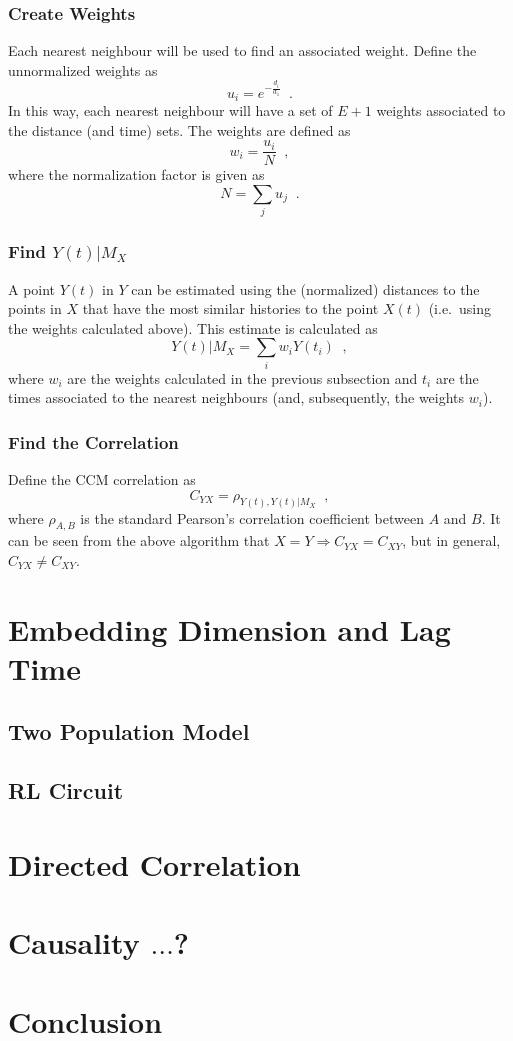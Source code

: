 \documentclass[a4paper,11pt]{article}
\begin{document}
\subsubsection{Create Weights}
Each nearest neighbour will be used to find an associated weight.  Define the unnormalized weights as$$u_i = e^{-\frac{d_i}{d_1}}\;\;.$$In this way, each nearest neighbour will have a set of $E+1$ weights associated to the distance (and time) sets.  The weights are defined as
$$
w_i = \frac{u_i}{N}\;\;,
$$
where the normalization factor is given as
$$
N = \sum_j u_j\;\;.
$$

\subsubsection{Find $Y(t)|M_X$}
A point $Y(t)$ in $Y$ can be estimated using the (normalized) distances to the points in $X$ that have the most similar histories to the point $X(t)$ (i.e.\ using the weights calculated above).  This estimate is calculated as$$Y(t)|M_X = \sum_i w_i Y(t_i)\;\;,$$where $w_i$ are the weights calculated in the previous subsection and $t_i$ are the times associated to the nearest neighbours (and, subsequently, the weights $w_i$).

\subsubsection{Find the Correlation}
Define the CCM correlation as 
$$
C_{YX} = \rho_{Y(t),Y(t)|M_X}\;\;,
$$
where $\rho_{A,B}$ is the standard Pearson's correlation coefficient between $A$ and $B$.  It can be seen from the above algorithm that $X=Y \Rightarrow C_{YX}=C_{XY}$, but in general, $C_{YX}\neq C_{XY}$.  

\section{Embedding Dimension and Lag Time}
\subsection{Two Population Model}
\subsection{RL Circuit}
\section{Directed Correlation}
\section{Causality $\ldots$?}
\section{Conclusion}
\end{document}

